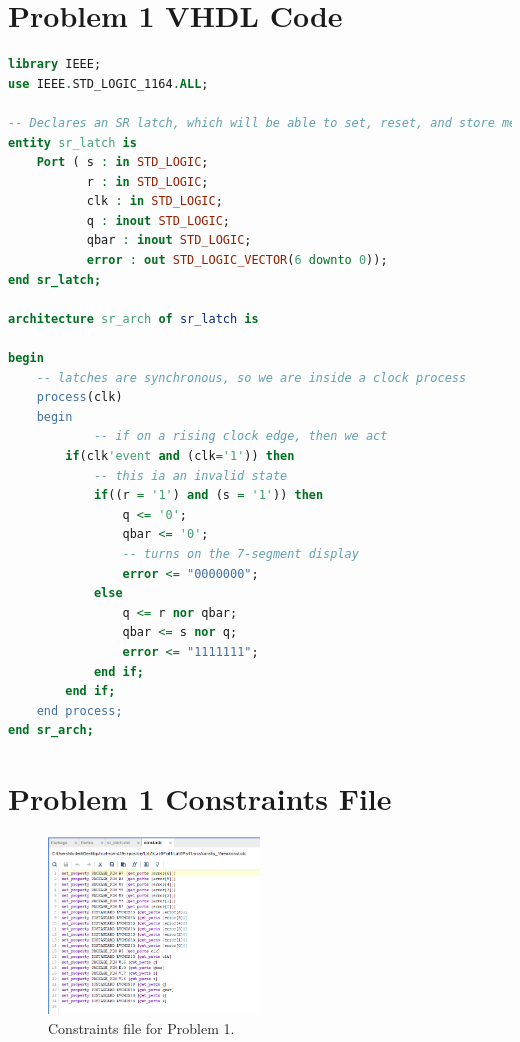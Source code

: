\documentclass[11pt]{article}
\begin{document}
\begin{appendices}

\section{Problem 1 VHDL Code}

\begin{lstlisting}[language=VHDL]
library IEEE;
use IEEE.STD_LOGIC_1164.ALL;

-- Declares an SR latch, which will be able to set, reset, and store memory
entity sr_latch is
    Port ( s : in STD_LOGIC;
           r : in STD_LOGIC;
           clk : in STD_LOGIC;
           q : inout STD_LOGIC;
           qbar : inout STD_LOGIC;
           error : out STD_LOGIC_VECTOR(6 downto 0));
end sr_latch;

architecture sr_arch of sr_latch is

begin
	-- latches are synchronous, so we are inside a clock process
    process(clk)
    begin
    		-- if on a rising clock edge, then we act
        if(clk'event and (clk='1')) then
        	-- this ia an invalid state
            if((r = '1') and (s = '1')) then
                q <= '0';
                qbar <= '0';
                -- turns on the 7-segment display
                error <= "0000000";
            else
                q <= r nor qbar;
                qbar <= s nor q;
                error <= "1111111";
            end if;
        end if;
    end process;
end sr_arch;
\end{lstlisting}

\section{Problem 1 Constraints File}
\begin{figure}[H]
\begin{center}
	\includegraphics[width=0.5\textwidth]{./images/Lab5Part1Const.png}
	\caption{\label{fig:Part1ConstFile}Constraints file for Problem 1.}
\end{center}
\end{figure}


\end{appendices}
\end{document}
